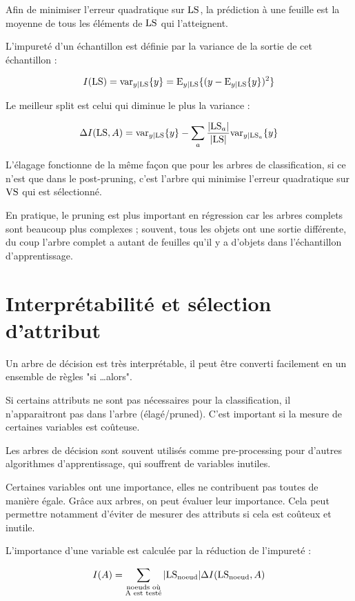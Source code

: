 	
	Afin de minimiser l'erreur quadratique sur $\text{LS}$, la prédiction à une feuille est la moyenne de tous les éléments de $\text{LS}$ qui l'atteignent.
	
	L'impureté d'un échantillon est définie par la variance de la sortie de cet échantillon :
	
	$$I(\text{LS}) = \text{var}_{y \vert \text{LS}} \lbrace y \rbrace = \text{E}_{y \vert \text{LS}}\lbrace (y - \text{E}_{y \vert \text{LS}}\lbrace y \rbrace)^2 \rbrace$$
	
	Le meilleur split est celui qui diminue le plus la variance :
	
	$$\Delta I(\text{LS}, A) =\text{var}_{y \vert \text{LS}} \lbrace y \rbrace - \sum_a \frac{\vert \text{LS}_a \vert}{\vert \text{LS} \vert} \text{var}_{y \vert \text{LS}_a} \lbrace y \rbrace$$

	L'élagage fonctionne de la même façon que pour les arbres de classification, si ce n'est que dans le post-pruning, c'est l'arbre qui minimise l'erreur quadratique sur $\text{VS}$ qui est sélectionné.
	
	En pratique, le pruning est plus important en régression car les arbres complets sont beaucoup plus complexes ; souvent, tous les objets ont une sortie différente, du coup l'arbre complet a autant de feuilles qu'il y a d'objets dans l'échantillon d'apprentissage.


\section{Interprétabilité et sélection d'attribut}
	
	Un arbre de décision est très interprétable, il peut être converti facilement en un ensemble de règles "si \dots alors".
	
	Si certains attributs ne sont pas nécessaires pour la classification, il n'apparaitront pas dans l'arbre (élagé/pruned). C'est important si la mesure de certaines variables est coûteuse.
	
	Les arbres de décision sont souvent utilisés comme pre-processing pour d'autres algorithmes d'apprentissage, qui souffrent de variables inutiles.
	
	Certaines variables ont une importance, elles ne contribuent pas toutes de manière égale. Grâce aux arbres, on peut évaluer leur importance. Cela peut permettre notamment d'éviter de mesurer des attributs si cela est coûteux et inutile.
	
	L'importance d'une variable est calculée par la réduction de l'impureté :
	
	$$I(A) = \sum_{\substack{\text{noeuds où} \\ \text{A est testé}}} \vert \text{LS}_{\text{noeud}} \vert \Delta I(\text{LS}_{\text{noeud}}, A)$$
	
